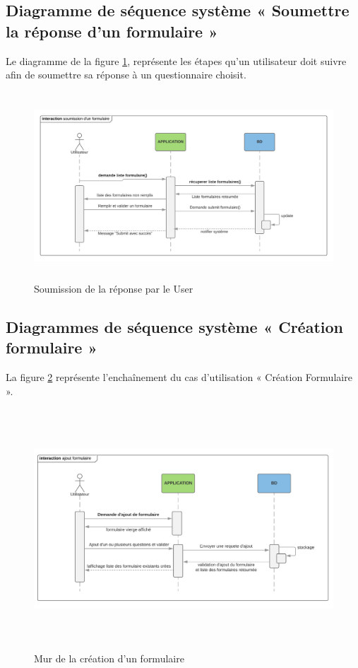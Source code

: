 \subsection{Diagramme de séquence système « Soumettre la réponse d'un formulaire »}
Le diagramme de la figure \ref{fig4}, représente les étapes qu'un utilisateur doit suivre afin de soumettre sa réponse à un questionnaire choisit.  
  \begin{figure} [H]
    \centering
         \begin{center}
             \includegraphics [width=16cm,height=7cm] {SprintImage/Diagramme_seq_formSubmit.png}
            \caption{Soumission de la réponse par le User }
            \label{fig4}
        \end{center}
    \end{figure}
\newpage
\subsection{Diagrammes de séquence système « Création formulaire »}
La figure \ref{form2} représente l’enchaînement du cas d’utilisation « Création Formulaire ».
\begin{figure} [H]
    \centering
         \begin{center}
             \includegraphics [width=16cm,height=9cm] {SprintImage/Diagramme_seq_ajoutForm.png}
            \caption{Mur de la création d'un formulaire}
            \label{form2}
        \end{center}
    \end{figure}
